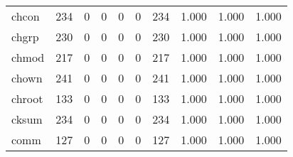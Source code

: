 \begin{longtable}{lp{1.3cm}p{1.3cm}p{1.3cm}p{1.3cm}p{1.3cm}p{1.3cm}p{1.3cm}p{1.3cm}p{1.3cm}}
chcon     &                    234 &                                  0 &                                 0 &                                0 &                                 0 &                             234 &                                1.000 &                                  1.000 &                                1.000 \\
chgrp     &                    230 &                                  0 &                                 0 &                                0 &                                 0 &                             230 &                                1.000 &                                  1.000 &                                1.000 \\
chmod     &                    217 &                                  0 &                                 0 &                                0 &                                 0 &                             217 &                                1.000 &                                  1.000 &                                1.000 \\
chown     &                    241 &                                  0 &                                 0 &                                0 &                                 0 &                             241 &                                1.000 &                                  1.000 &                                1.000 \\
chroot    &                    133 &                                  0 &                                 0 &                                0 &                                 0 &                             133 &                                1.000 &                                  1.000 &                                1.000 \\
cksum     &                    234 &                                  0 &                                 0 &                                0 &                                 0 &                             234 &                                1.000 &                                  1.000 &                                1.000 \\
comm      &                    127 &                                  0 &                                 0 &                                0 &                                 0 &                             127 &                                1.000 &                                  1.000 &                                1.000 \\

\end{longtable}
